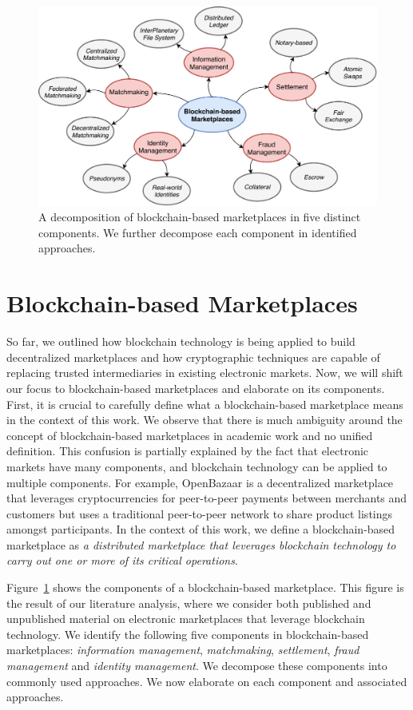 \begin{figure}[t]
	\centering
	\includegraphics[width=\linewidth]{introduction/assets/decomposition}
	\caption{A decomposition of blockchain-based marketplaces in five distinct components. We further decompose each component in identified approaches.}
	\label{fig:electronic_markets}
\end{figure}

\section{Blockchain-based Marketplaces}
So far, we outlined how blockchain technology is being applied to build decentralized marketplaces and how cryptographic techniques are capable of replacing trusted intermediaries in existing electronic markets.
Now, we will shift our focus to blockchain-based marketplaces and elaborate on its components.
First, it is crucial to carefully define what a blockchain-based marketplace means in the context of this work.
We observe that there is much ambiguity around the concept of blockchain-based marketplaces in academic work and no unified definition.
This confusion is partially explained by the fact that electronic markets have many components, and blockchain technology can be applied to multiple components.
For example, OpenBazaar is a decentralized marketplace that leverages cryptocurrencies for peer-to-peer payments between merchants and customers but uses a traditional peer-to-peer network to share product listings amongst participants.
In the context of this work, we define a blockchain-based marketplace as \emph{a distributed marketplace that leverages blockchain technology to carry out one or more of its critical operations}.

Figure~\ref{fig:electronic_markets} shows the components of a blockchain-based marketplace.
This figure is the result of our literature analysis, where we consider both published and unpublished material on electronic marketplaces that leverage blockchain technology.
We identify the following five components in blockchain-based marketplaces: \emph{information management}, \emph{matchmaking}, \emph{settlement}, \emph{fraud management} and \emph{identity management}.
We decompose these components into commonly used approaches.
We now elaborate on each component and associated approaches.

